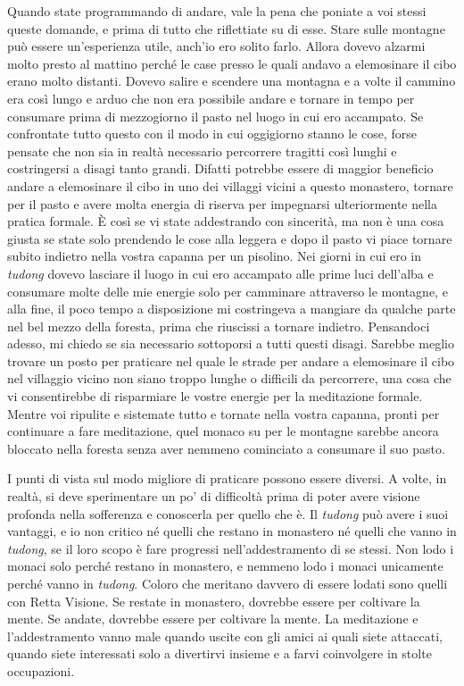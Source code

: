 Quando state programmando di andare, vale la pena che poniate a voi
stessi queste domande, e prima di tutto che riflettiate su di esse.
Stare sulle montagne può essere un'esperienza utile, anch'io ero solito
farlo. Allora dovevo alzarmi molto presto al mattino perché le case
presso le quali andavo a elemosinare il cibo erano molto distanti.
Dovevo salire e scendere una montagna e a volte il cammino era così
lungo e arduo che non era possibile andare e tornare in tempo per
consumare prima di mezzogiorno il pasto nel luogo in cui ero accampato.
Se confrontate tutto questo con il modo in cui oggigiorno stanno le
cose, forse pensate che non sia in realtà necessario percorrere tragitti
così lunghi e costringersi a disagi tanto grandi. Difatti potrebbe
essere di maggior beneficio andare a elemosinare il cibo in uno dei
villaggi vicini a questo monastero, tornare per il pasto e avere molta
energia di riserva per impegnarsi ulteriormente nella pratica formale. È
così se vi state addestrando con sincerità, ma non è una cosa giusta se
state solo prendendo le cose alla leggera e dopo il pasto vi piace
tornare subito indietro nella vostra capanna per un pisolino. Nei giorni
in cui ero in \emph{tudong} dovevo lasciare il luogo in cui ero
accampato alle prime luci dell'alba e consumare molte delle mie energie
solo per camminare attraverso le montagne, e alla fine, il poco tempo a
disposizione mi costringeva a mangiare da qualche parte nel bel mezzo
della foresta, prima che riuscissi a tornare indietro. Pensandoci
adesso, mi chiedo se sia necessario sottoporsi a tutti questi disagi.
Sarebbe meglio trovare un posto per praticare nel quale le strade per
andare a elemosinare il cibo nel villaggio vicino non siano troppo
lunghe o difficili da percorrere, una cosa che vi consentirebbe di
risparmiare le vostre energie per la meditazione formale. Mentre voi
ripulite e sistemate tutto e tornate nella vostra capanna, pronti per
continuare a fare meditazione, quel monaco su per le montagne sarebbe
ancora bloccato nella foresta senza aver nemmeno cominciato a consumare
il suo pasto.

I punti di vista sul modo migliore di praticare possono essere diversi.
A volte, in realtà, si deve sperimentare un po' di difficoltà prima di
poter avere visione profonda nella sofferenza e conoscerla per quello
che è. Il \emph{tudong} può avere i suoi vantaggi, e io non critico né
quelli che restano in monastero né quelli che vanno in \emph{tudong}, se
il loro scopo è fare progressi nell'addestramento di se stessi. Non lodo
i monaci solo perché restano in monastero, e nemmeno lodo i monaci
unicamente perché vanno in \emph{tudong}. Coloro che meritano davvero di
essere lodati sono quelli con Retta Visione. Se restate in monastero,
dovrebbe essere per coltivare la mente. Se andate, dovrebbe essere per
coltivare la mente. La meditazione e l'addestramento vanno male quando
uscite con gli amici ai quali siete attaccati, quando siete interessati
solo a divertirvi insieme e a farvi coinvolgere in stolte occupazioni.

